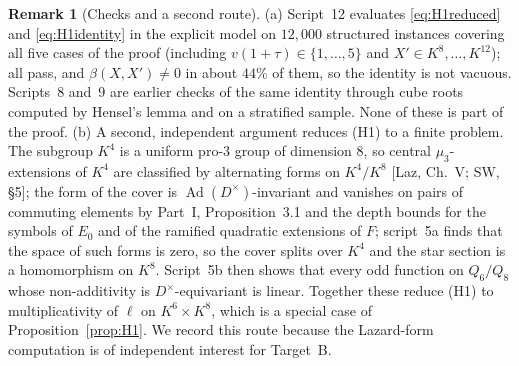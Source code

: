 \documentclass[11pt]{article}
\newcommand{\Ad}{\operatorname{Ad}}
\theoremstyle{plain}
\theoremstyle{definition}
\newtheorem{remark}[theorem]{Remark}
\begin{document}
\begin{remark}[Checks and a second route]\label{rem:H1-checks}
(a) Script~12 evaluates \eqref{eq:H1reduced} and \eqref{eq:H1identity}
in the explicit model on $12{,}000$ structured instances covering all
five cases of the proof (including $v(1+\tau)\in\{1,\dots,5\}$ and
$X'\in K^8,\dots,K^{12}$); all pass, and $\beta(X,X')\ne0$ in about
$44\%$ of them, so the identity is not vacuous.  Scripts~8 and~9 are
earlier checks of the same identity through cube roots computed by
Hensel's lemma and on a stratified sample.  None of these is part of
the proof.
(b) A second, independent argument reduces (H1) to a finite problem.
The subgroup $K^4$ is a uniform pro-$3$ group of dimension $8$, so
central $\mu_3$-extensions of $K^4$ are classified by alternating forms
on $K^4/K^8$ [Laz, Ch.~V; SW, \S5]; the form of the cover is
$\Ad(D^\times)$-invariant and vanishes on pairs of commuting elements by
Part~I, Proposition~3.1 and the depth bounds for the symbols of
$E_0$ and of the ramified quadratic extensions of $F$; script~5a finds
that the space of such forms is zero, so the cover splits over $K^4$
and the star section is a homomorphism on $K^8$.  Script~5b then shows
that every odd function on $Q_6/Q_8$ whose non-additivity is
$D^\times$-equivariant is linear.  Together these reduce (H1) to
multiplicativity of $\ell$ on $K^6\times K^8$, which is a special case
of Proposition~\ref{prop:H1}.  We record this route because the
Lazard-form computation is of independent interest for Target~B.
\end{remark}
\end{document}
